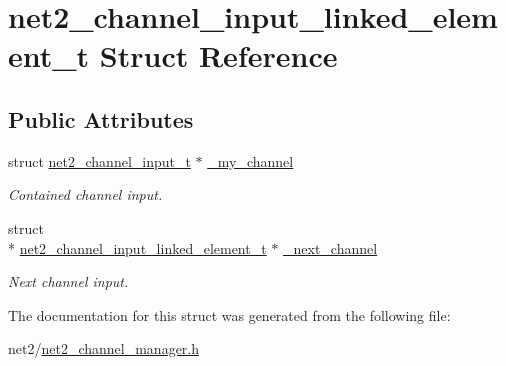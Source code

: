 \hypertarget{structnet2__channel__input__linked__element__t}{\section{net2\-\_\-channel\-\_\-input\-\_\-linked\-\_\-element\-\_\-t Struct Reference}
\label{structnet2__channel__input__linked__element__t}
}
\subsection*{Public Attributes}
\begin{DoxyCompactItemize}
\item 
\hypertarget{structnet2__channel__input__linked__element__t_ad736ec541c37469b5e0e92f1bacc2a62}{struct \hyperlink{structnet2__channel__input__t}{net2\-\_\-channel\-\_\-input\-\_\-t} $\ast$ \hyperlink{structnet2__channel__input__linked__element__t_ad736ec541c37469b5e0e92f1bacc2a62}{\-\_\-my\-\_\-channel}}\label{structnet2__channel__input__linked__element__t_ad736ec541c37469b5e0e92f1bacc2a62}

\begin{DoxyCompactList}\small\item\em Contained channel input. \end{DoxyCompactList}\item 
\hypertarget{structnet2__channel__input__linked__element__t_a1b40af29290880f2edb70e6371ce0a50}{struct \\*
\hyperlink{structnet2__channel__input__linked__element__t}{net2\-\_\-channel\-\_\-input\-\_\-linked\-\_\-element\-\_\-t} $\ast$ \hyperlink{structnet2__channel__input__linked__element__t_a1b40af29290880f2edb70e6371ce0a50}{\-\_\-next\-\_\-channel}}\label{structnet2__channel__input__linked__element__t_a1b40af29290880f2edb70e6371ce0a50}

\begin{DoxyCompactList}\small\item\em Next channel input. \end{DoxyCompactList}\end{DoxyCompactItemize}


The documentation for this struct was generated from the following file\-:\begin{DoxyCompactItemize}
\item 
net2/\hyperlink{net2__channel__manager_8h}{net2\-\_\-channel\-\_\-manager.\-h}\end{DoxyCompactItemize}
